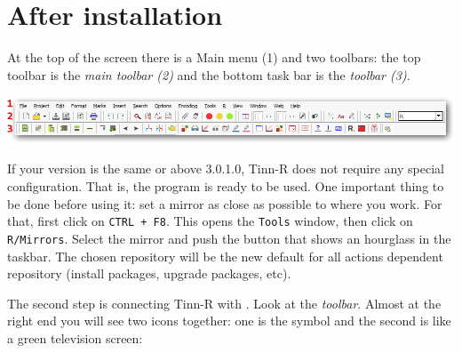 
\hypertarget{secrets_after_installation}{}
\section{After installation}

At the top of the screen there is a Main menu (1) and two toolbars: the top toolbar is the \textit{main toolbar (2)}
and the bottom task bar is the \textit{\RR{} toolbar (3)}.

\includegraphics[scale=0.50]{./res/parts_02.png}

%


If your version is the same or above 3.0.1.0, Tinn-R does not require any special configuration.
That is, the program is ready to be used. One important thing to be done before using it:
set a \RR{} mirror as close as possible to where you work. For that, first click on \texttt{CTRL + F8}.
This opens the \texttt{Tools} window, then click on \texttt{R/Mirrors}.
Select the \RR{} mirror and push the button that shows an hourglass in the taskbar.
The chosen repository will be the new default for all actions dependent repository
(install packages, upgrade packages, etc).

The second step is connecting Tinn-R with \RR{}. Look at the \textit{\RR{} toolbar}.
Almost at the right end you will see two icons together: one is the \RR{} symbol and the second is like a green television screen:

